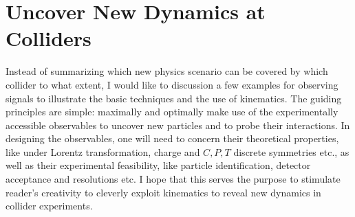 \documentclass[prd,aps,floats,preprintnumbers,preprint,superscriptaddress,floatfix,nofootinbib]{revtex4}
\def\gev{{\rm GeV}}
\def\fb{{\rm fb}}
\def\cmsq{{\rm cm}^2}
\def\bea{\begin{eqnarray}}
\def\eea{\end{eqnarray}}
\begin{document}
\section{ Uncover New Dynamics at Colliders }
\label{uncover}

Instead of summarizing which new physics scenario can be covered
by which collider to what extent, I would like to discussion a few 
examples for observing signals to illustrate the basic techniques
and the use of kinematics. 
The guiding principles are simple: maximally and optimally make use
of the experimentally accessible observables to uncover new particles
and to probe their interactions. In designing the observables, one will
need to concern their theoretical properties, like under Lorentz transformation,
charge and $C,P,T$ discrete symmetries etc., as well as their experimental
feasibility, like particle identification,  detector acceptance and resolutions etc. 
I hope that this serves the purpose to 
stimulate reader's creativity to cleverly exploit kinematics to reveal 
new  dynamics in collider experiments.

\end{document}
